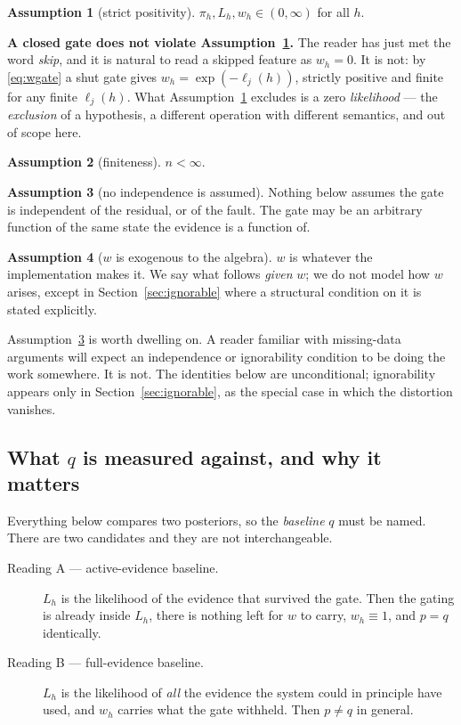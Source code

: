 \documentclass[11pt,a4paper]{article}
\theoremstyle{definition}
\newtheorem{assumption}{Assumption}
\begin{document}
\begin{assumption}[strict positivity]\label{a:pos}
$\pi_h, L_h, w_h \in (0,\infty)$ for all $h$.
\end{assumption}

\noindent
\textbf{A closed gate does not violate Assumption~\ref{a:pos}.} The reader has
just met the word \emph{skip}, and it is natural to read a skipped feature as
$w_h=0$. It is not: by \eqref{eq:wgate} a shut gate gives
$w_h=\exp(-\ell_j(h))$, strictly positive and finite for any finite
$\ell_j(h)$. What Assumption~\ref{a:pos} excludes is a zero \emph{likelihood}
--- the \emph{exclusion} of a hypothesis, a different operation with different
semantics, and out of scope here.
\begin{assumption}[finiteness]\label{a:fin}
$n<\infty$.
\end{assumption}
\begin{assumption}[no independence is assumed]\label{a:indep}
Nothing below assumes the gate is independent of the residual, or of the
fault. The gate may be an arbitrary function of the same state the evidence is
a function of.
\end{assumption}
\begin{assumption}[$w$ is exogenous to the algebra]\label{a:w}
$w$ is whatever the implementation makes it. We say what follows \emph{given}
$w$; we do not model how $w$ arises, except in
Section~\ref{sec:ignorable} where a structural condition on it is stated
explicitly.
\end{assumption}

Assumption~\ref{a:indep} is worth dwelling on. A reader familiar with
missing-data arguments will expect an independence or ignorability condition
to be doing the work somewhere. It is not. The identities below are
unconditional; ignorability appears only in Section~\ref{sec:ignorable}, as
the special case in which the distortion vanishes.

\subsection{What $q$ is measured against, and why it matters}
\label{sec:baseline}

Everything below compares two posteriors, so the \emph{baseline} $q$ must be
named. There are two candidates and they are not interchangeable.

\begin{description}
\item[Reading A --- active-evidence baseline.] $L_h$ is the likelihood of the
      evidence that survived the gate. Then the gating is already inside
      $L_h$, there is nothing left for $w$ to carry, $w_h\equiv 1$, and
      $p=q$ identically.
\item[Reading B --- full-evidence baseline.] $L_h$ is the likelihood of
      \emph{all} the evidence the system could in principle have used, and
      $w_h$ carries what the gate withheld. Then $p\ne q$ in general.
\end{description}
\end{document}
